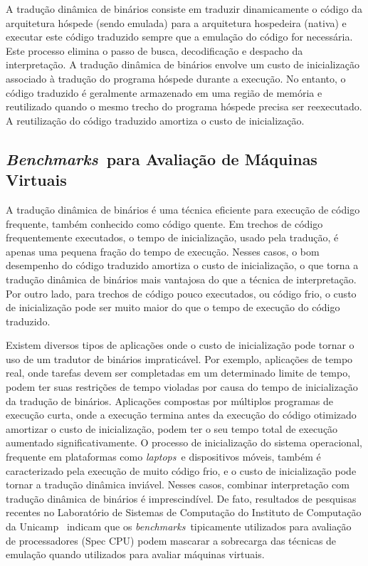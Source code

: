 \documentclass[a4paper,12pt]{article}
\newcommand{\benchmarks}{\emph{benchmarks}}
\newcommand{\Benchmarks}{\emph{Benchmarks}}
\newcommand{\laptops}{\emph{laptops}}
\begin{document}
A tradução dinâmica de binários consiste em traduzir dinamicamente o código da
arquitetura hóspede (sendo emulada) para a arquitetura hospedeira (nativa) e
executar este código traduzido sempre que a emulação do código for necessária.
Este processo elimina o passo de busca, decodificação e despacho da
interpretação.  A tradução dinâmica de binários envolve um custo de
inicialização associado à tradução do programa hóspede durante a execução. No
entanto, o código traduzido é geralmente armazenado em uma região de memória e
reutilizado quando o mesmo trecho do programa hóspede precisa ser reexecutado. A
reutilização do código traduzido amortiza o custo de inicialização.

\subsection{\Benchmarks\ para Avaliação de Máquinas Virtuais}
\label{subsec:av}
A tradução dinâmica de binários é uma técnica eficiente para execução de código
frequente, também conhecido como código quente. Em trechos de código
frequentemente executados, o tempo de inicialização, usado pela tradução, é
apenas uma pequena fração do tempo de execução. Nesses casos, o bom desempenho
do código traduzido amortiza o custo de inicialização, o que torna a tradução
dinâmica de binários mais vantajosa do que a técnica de interpretação. Por outro
lado, para trechos de código pouco executados, ou código frio, o custo de
inicialização pode ser muito maior do que o tempo de execução do código
traduzido.

Existem diversos tipos de aplicações onde o custo de inicialização pode tornar o
uso de um tradutor de binários impraticável. Por exemplo, aplicações de tempo
real, onde tarefas devem ser completadas em um determinado limite de tempo,
podem ter suas restrições de tempo violadas por causa do tempo de inicialização
da tradução de binários. Aplicações compostas por múltiplos programas de
execução curta, onde a execução termina antes da execução do código otimizado
amortizar o custo de inicialização, podem ter o seu tempo total de execução
aumentado significativamente. O processo de inicialização do sistema
operacional, frequente em plataformas como \laptops\ e dispositivos móveis,
também é caracterizado pela execução de muito código frio, e o custo de
inicialização pode tornar a tradução dinâmica inviável. Nesses casos, combinar
interpretação com tradução dinâmica de binários é imprescindível.  De fato,
resultados de pesquisas recentes no Laboratório de Sistemas de Computação do
Instituto de Computação da Unicamp~\cite{divino2012wish} indicam que os
\benchmarks\ tipicamente utilizados para avaliação de processadores (Spec CPU)
podem mascarar a sobrecarga das técnicas de emulação quando utilizados para
avaliar máquinas virtuais. 
\end{document}

